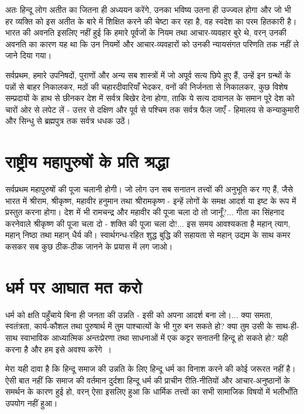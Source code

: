 अतः हिन्दू लोग अतीत का जितना ही अध्ययन करेंगे, उनका भविष्य उतना ही उज्ज्वल होगा और जो भी हर व्यक्ति को इस अतीत के बारे में शिक्षित करने की चेष्टा कर रहा है, वह स्वदेश का परम हितकारी है। भारत की अवनति इसलिए नहीं हुई कि हमारे पूर्वजों के नियम तथा आचार-व्यवहार बुरे थे, वरन् उनकी अवनति का कारण यह था कि उन नियमों और आचार-व्यवहारों को उनकी न्यायसंगत परिणति तक नहीं ले जाने दिया गया। 

सर्वप्रथम, हमारे उपनिषदों, पुराणों और अन्य सब शास्त्रों में जो अपूर्व सत्य छिपे हुए हैं, उन्हें इन ग्रन्थों के पन्नों से बाहर निकालकर, मठों की चहारदीवारियाँ भेदकर, वनों की निर्जनता से निकालकर, कुछ विशेष सम्प्रदायों के हाथ से छीनकर देश में सर्वत्र बिखेर देना होगा, ताकि ये सत्य दावानल के समान पूरे देश को चारों ओर से लपेट लें - उत्तर से दक्षिण और पूर्व से पश्चिम तक सर्वत्र फैल जाएँ - हिमालय से कन्याकुमारी और सिन्धु से ब्रह्मपुत्र तक सर्वत्र धधक उठें।


\section*{राष्ट्रीय महापुरुषों के प्रति श्रद्धा}

\vskip -3pt

सर्वप्रथम महापुरुषों की पूजा चलानी होगी। जो लोग उन सब सनातन तत्त्वों की अनुभूति कर गए हैं, जैसे भारत में श्रीराम, श्रीकृष्ण, महावीर हनुमान तथा श्रीरामकृष्ण - इन्हें लोगों के समक्ष आदर्श या इष्ट के रूप में प्रस्तुत करना होगा। देश में भी रामचन्द्र और महावीर की पूजा चला दो तो जानूँ?... गीता का सिंहनाद करनेवाले श्रीकृष्ण की पूजा चला दो - शक्ति की पूजा चला दो!... इस समय आवश्यकता है महान् त्याग, महान् निष्ठा तथा महान् धैर्य की। स्वार्थगन्ध-रहित शुद्ध बुद्धि की सहायता से महान् उद्यम के साथ कमर कसकर सब कुछ ठीक-ठीक जानने के प्रयास में लग जाओ।


\section*{धर्म पर आघात मत करो}


धर्म को क्षति पहुँचाये बिना ही जनता की उन्नति - इसी को अपना आदर्श बना लो।... क्या समता, स्वतंत्रता, कार्य-कौशल तथा पुरुषार्थ में तुम पाश्चात्यों के भी गुरु बन सकते हो? क्या तुम उसी के साथ-ही-साथ स्वाभाविक आध्यात्मिक अन्तःप्रेरणा तथा साधनाओं में एक कट्टर सनातनी हिन्दू हो सकते हो? यही करना है और हम इसे अवश्य करेंगे~। 

मेरा यही दावा है कि हिन्दू समाज की उन्नति के लिए हिन्दू धर्म का विनाश करने की कोई जरूरत नहीं है। ऐसी बात नहीं कि समाज की वर्तमान दुर्दशा हिन्दू धर्म की प्राचीन रीति-नीतियों और आचार-अनुष्ठानों के समर्थन के कारण हुई हो, वरन् ऐसा इसलिए हुआ कि धार्मिक तत्त्वों का सभी सामाजिक विषयों में भलीभाँति उपयोग नहीं हुआ। 

